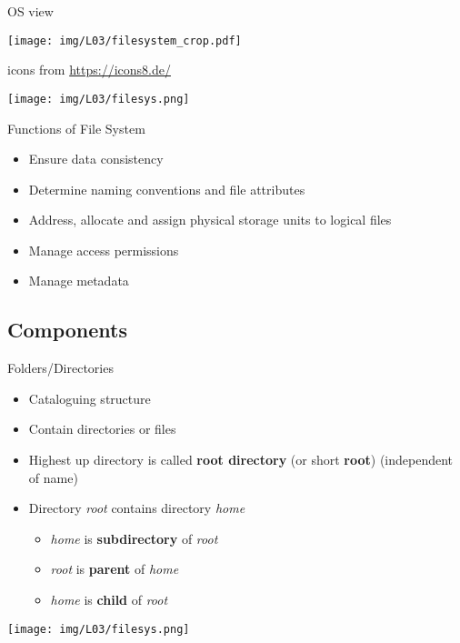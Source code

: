\documentclass[hyperref={pdfpagelabels=false},aspectratio=169]{beamer}
\begin{document}
\begin{frame}{OS view}
    
    \begin{minipage}{0.49\textwidth}
       \centering
        \texttt{[image: img/L03/filesystem\_crop.pdf]}
        
        \tiny
        icons from \url{https://icons8.de/}
    \end{minipage}
    \begin{minipage}{0.49\textwidth}
        \centering
        \texttt{[image: img/L03/filesys.png]}
    \end{minipage}
\end{frame}

\begin{frame}{Functions of File System}

\begin{itemize}
    \item Ensure data consistency 
    \item Determine naming conventions and file attributes
    \item Address, allocate and assign physical storage units to logical files
    \item Manage access permissions
    \item Manage metadata
\end{itemize}
    
\end{frame}

\subsection*{Components}

\begin{frame}{Folders/Directories}
    \begin{minipage}{0.5\textwidth}
        \begin{itemize}
            \item Cataloguing structure
            \item Contain directories or files
            \item Highest up directory is called \textbf{root directory} (or short \textbf{root}) (independent of name)
            \item Directory \textit{root} contains directory \textit{home}
            \begin{itemize}
                \item \textit{home} is \textbf{subdirectory} of \textit{root}
                \item \textit{root} is \textbf{parent} of \textit{home}
                \item \textit{home} is \textbf{child} of \textit{root}
            \end{itemize} 
        \end{itemize}
    \end{minipage}
    \begin{minipage}{0.49\textwidth}
        \centering
        \texttt{[image: img/L03/filesys.png]}
    \end{minipage}
   
\end{frame}
\end{document}
